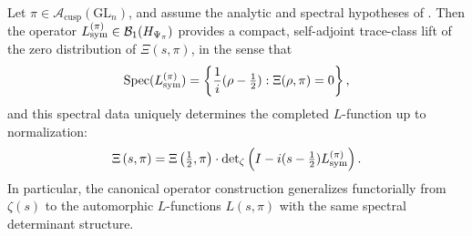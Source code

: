 \begin{corollary}
\label{cor:functorial_lifting_spec_encoding}
Let \( \pi \in \mathcal{A}_{\mathrm{cusp}}(\mathrm{GL}_n) \), and assume the analytic and spectral hypotheses of . Then the operator \( L_{\mathrm{sym}}^{(\pi)} \in \mathcal{B}_1(H_{\Psi_{\pi}}) \) provides a compact, self-adjoint trace-class lift of the zero distribution of \( \Xi(s, \pi) \), in the sense that
\[
\operatorname{Spec}(L_{\mathrm{sym}}^{(\pi)}) = \left\{ \frac{1}{i}(\rho - \tfrac{1}{2}) : \Xi(\rho, \pi) = 0 \right\},
\]
and this spectral data uniquely determines the completed \( L \)-function up to normalization:
\[
\Xi\left(s, \pi\right) = \Xi\left(\tfrac{1}{2}, \pi\right) \cdot \det\nolimits_{\zeta}\left(I - i(s - \tfrac{1}{2}) L_{\mathrm{sym}}^{(\pi)} \right).
\]
In particular, the canonical operator construction generalizes functorially from \( \zeta(s) \) to the automorphic \( L \)-functions \( L(s, \pi) \) with the same spectral determinant structure.
\end{corollary}
